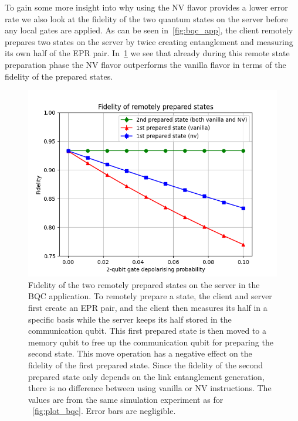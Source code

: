 To gain some more insight into why using the NV flavor provides a lower error rate we also look at the fidelity of the two quantum states on the server before any local gates are applied.
As can be seen in~\cref{fig:bqc_app}, the client remotely prepares two states on the server by twice creating entanglement and measuring its own half of the EPR pair.
In~\cref{fig:plot_bqc_fidelity} we see that already during this remote state preparation phase the NV flavor outperforms the vanilla flavor in terms of the fidelity of the prepared states.

\begin{figure}[t]
  \centering
  \includegraphics[scale=0.8]{figures/netqasm/plots/bqc_sweep_gate_noise_epr_fidelity.png}
  \caption{ Fidelity of the two remotely prepared states on the server in
        the BQC application. To remotely prepare a state, the client and server
        first create an EPR pair, and the client then measures its half in a
        specific basis while the server keeps its half stored in the
        communication qubit. This first prepared state is then moved to a memory
        qubit to free up the communication qubit for preparing the second state.
        This move operation has a negative effect on the fidelity of the first
        prepared state. Since the fidelity of the second prepared state only
        depends on the link entanglement generation, there is no difference
        between using vanilla or NV instructions. The values are from the same
        simulation experiment as for ~\cref{fig:plot_bqc}. Error bars are
        negligible.}
  \label{fig:plot_bqc_fidelity}
\end{figure}

